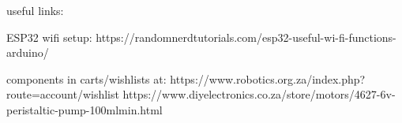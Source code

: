 useful links:

ESP32 wifi setup: https://randomnerdtutorials.com/esp32-useful-wi-fi-functions-arduino/


components in carts/wishlists at: 
https://www.robotics.org.za/index.php?route=account/wishlist
https://www.diyelectronics.co.za/store/motors/4627-6v-peristaltic-pump-100mlmin.html